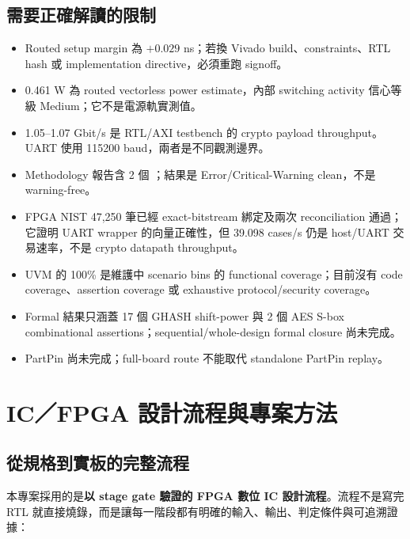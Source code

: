 \documentclass[UTF8,fontset=none,11pt,a4paper]{ctexrep}
\newcommand{\code}[1]{\texttt{\detokenize{#1}}}
\begin{document}
\section{需要正確解讀的限制}

\begin{itemize}
  \item Routed setup margin 為 $+0.029$ ns；若換 Vivado build、constraints、RTL hash 或 implementation directive，必須重跑 signoff。
  \item 0.461 W 為 routed vectorless power estimate，內部 switching activity 信心等級 Medium；它不是電源軌實測值。
  \item 1.05--1.07 Gbit/s 是 RTL/AXI testbench 的 crypto payload throughput。UART 使用 115200 baud，兩者是不同觀測邊界。
  \item Methodology 報告含 2 個 \code{SYNTH-6 Warning}；結果是 Error/Critical-Warning clean，不是 warning-free。
  \item FPGA NIST 47,250 筆已經 exact-bitstream 綁定及兩次 reconciliation 通過；它證明 UART wrapper 的向量正確性，但 39.098 cases/s 仍是 host/UART 交易速率，不是 crypto datapath throughput。
  \item UVM 的 100\% 是維護中 scenario bins 的 functional coverage；目前沒有 code coverage、assertion coverage 或 exhaustive protocol/security coverage。
  \item Formal 結果只涵蓋 17 個 GHASH shift-power 與 2 個 AES S-box combinational assertions；sequential/whole-design formal closure 尚未完成。
  \item PartPin 尚未完成；full-board route 不能取代 standalone PartPin replay。
\end{itemize}

\chapter{IC／FPGA 設計流程與專案方法}
\label{chap:ic-fpga-design-flow}

\section{從規格到實板的完整流程}

本專案採用的是\textbf{以 stage gate 驗證的 FPGA 數位 IC 設計流程}。流程不是寫完 RTL 就直接燒錄，而是讓每一階段都有明確的輸入、輸出、判定條件與可追溯證據：

\begin{center}
\small
{}
\end{center}
\end{document}
